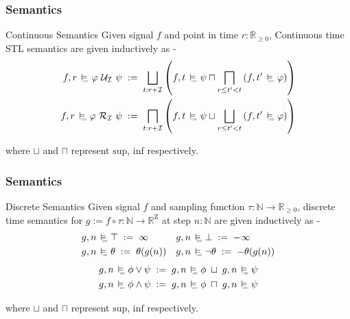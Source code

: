 \documentclass{beamer}
\newcommand{\typeTime}{\mathbb{R}_{\geq 0}}
\newcommand{\typeReal}{\mathbb{R}}
\newcommand{\typeNat}{\mathbb{N}}
\newcommand{\until}{\mathcal{U}}
\newcommand{\release}{\mathcal{R}}
\newcommand{\interval}{\mathcal{I}}
\newcommand{\Z}{\text{Z}}
\newcommand{\discrete}{\raisebox{-0.1ex}{\scalebox{0.25}{\textrm{DSC}}}}
\newcommand{\cont}{\raisebox{-0.1ex}{\scalebox{0.25}{\textrm{CNT}}}}
\newcommand{\discreteSatisfy}{\ \stackMath\stackunder[0pt]{\vDash}{\hspace*{0.3em}\discrete}\ }
\newcommand{\contSatisfy}{\ \stackMath\stackunder[0pt]{\vDash}{\hspace*{0.3em}\cont}\ }
\newcommand{\robustAssign}{\; := \;}
\begin{document}
\begin{frame}
    \frametitle{Semantics}
    \begin{block}{Continuous Semantics}
        Given signal $f$ and point in time $r : \typeTime$,
        Continuous time STL semantics are given inductively as -
        \begin{align*}
            f, r \contSatisfy \varphi\ \until_{\interval}\ \psi
           \robustAssign \bigsqcup_{t: r+\interval}\left( f, t \contSatisfy \psi
           \sqcap \bigsqcap_{r \leq t' < t} \left( f, t' \contSatisfy \varphi
            \right ) \right) \\
            f, r \contSatisfy \varphi\ \release_{\interval}\ \psi
           \robustAssign \bigsqcap_{t: r+\interval}\left( f, t \contSatisfy \psi
           \sqcup \bigsqcup_{r \leq t' < t} \left( f, t' \contSatisfy \varphi
            \right ) \right)
        \end{align*}
    \end{block}
    where $\sqcup$ and $\sqcap$ represent $\text{sup}$, $\text{inf}$ respectively.
\end{frame}

\begin{frame}
    \frametitle{Semantics}
    \begin{block}{Discrete Semantics}
        Given signal $f$ and sampling function $\tau : \typeNat
        \to \typeTime$, discrete time semantics for $g := f \circ \tau : \typeNat
        \to  \typeReal^{\Z}$ at step $n:\typeNat$ are given inductively as -
        \begin{align*}
              g, n &\discreteSatisfy \top       \robustAssign \infty &
              g, n &\discreteSatisfy \bot       \robustAssign -\infty \\
              g, n &\discreteSatisfy \theta     \robustAssign \theta(g(n)) &
              g, n &\discreteSatisfy \neg\theta \robustAssign -\theta(g(n)) \\
        \end{align*}
        \vspace{-1.6cm}
        \begin{align*}
            g, n \discreteSatisfy \phi \vee \psi  \robustAssign  g, n \discreteSatisfy \phi \; \sqcup \; g, n\discreteSatisfy \psi \\
            g, n \discreteSatisfy \phi \wedge \psi  \robustAssign  g, n \discreteSatisfy \phi \; \sqcap \; g, n \discreteSatisfy \psi \\
        \end{align*}
    \end{block}
    where $\sqcup$ and $\sqcap$ represent $\text{sup}$, $\text{inf}$ respectively.
\end{frame}
\end{document}
